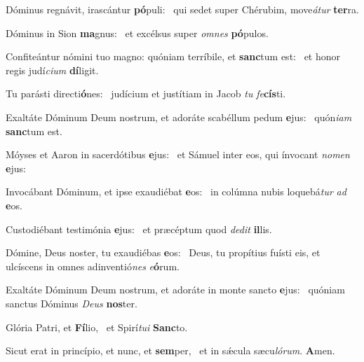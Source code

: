 \item Dóminus regnávit, irascántur \textbf{pó}puli:~\psstar{} qui sedet super Chérubim, move\textit{átur} \textbf{ter}ra.
\item Dóminus in Sion \textbf{ma}gnus:~\psstar{} et excélsus super \textit{omnes} \textbf{pó}pulos.
\item Confiteántur nómini tuo magno: quóniam terríbile, et \textbf{sanc}tum est:~\psstar{} et honor regis judí\textit{cium} \textbf{dí}ligit.
\item Tu parásti directi\textbf{ó}nes:~\psstar{} judícium et justítiam in Jacob \textit{tu} \textit{fe}\textbf{cís}ti.
\item Exaltáte Dóminum Deum nostrum, et adoráte scabéllum pedum \textbf{e}jus:~\psstar{} quón\textit{iam} \textbf{sanc}tum est.
\item Móyses et Aaron in sacerdótibus \textbf{e}jus:~\psstar{} et Sámuel inter eos, qui ínvocant \textit{nomen} \textbf{e}jus:
\item Invocábant Dóminum, et ipse exaudiébat \textbf{e}os:~\psstar{} in colúmna nubis loquebá\textit{tur} \textit{ad} \textbf{e}os.
\item Custodiébant testimónia \textbf{e}jus:~\psstar{} et præcéptum quod \textit{dedit} \textbf{il}lis.
\item Dómine, Deus noster, tu exaudiébas \textbf{e}os:~\psstar{} Deus, tu propítius fuísti eis, et ulcíscens in omnes adinventió\textit{nes} \textit{e}\textbf{ó}rum.
\item Exaltáte Dóminum Deum nostrum, et adoráte in monte sancto \textbf{e}jus:~\psstar{} quóniam sanctus Dóminus \textit{Deus} \textbf{nos}ter.
\item Glória Patri, et \textbf{Fí}lio,~\psstar{} et Spirí\textit{tui} \textbf{Sanc}to.
\item Sicut erat in princípio, et nunc, et \textbf{sem}per,~\psstar{} et in sǽcula sæcu\textit{lórum}. \textbf{A}men.
